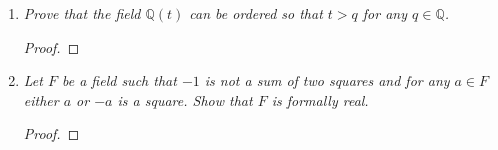 \documentclass{article}
\begin{document}
\begin{enumerate}[label={\bf Q\arabic*:}]
\begin{proof}
      Then $F(\sqrt{a})$ will be formally real (Lemma 13.15). But since $F$
      is real-closed, $F(\sqrt{a})$ cannot properly extend $F$, which
      implies that $\sqrt{a}$ is contained in $F$, and thus $a$ is a square
      in $F$. On the other hand, if $-a$ is a sum of squares, then
      exchanging the roles of $a$ and $-a$ in the above argument, we will
      get $-a$ is a square in $F$.
    \end{proof}

  \item \it Prove that the field $\mathbb{Q}(t)$ can be ordered so that
    $t>q$ for any $q\in\mathbb{Q}$.

    \begin{proof}
    \end{proof}

  \item \it Let $F$ be a field such that $-1$ is not a sum of two squares
    and for any $a\in F$ either $a$ or $-a$ is a square. Show that $F$ is
    formally real.

    \begin{proof}
    \end{proof}
\end{enumerate}
\end{document}
